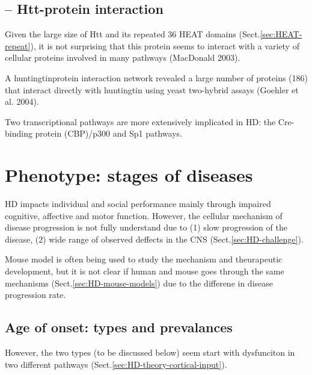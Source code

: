 \subsection{-- Htt-protein interaction}
\label{sec:HTT-protein-interaction}

Given the large size of Htt and its repeated 36 HEAT domains
(Sect.\ref{sec:HEAT-repeat}), it is not surprising that this protein seems to
interact with a variety of cellular proteins involved in many pathways
(MacDonald 2003).

A huntingtinprotein interaction network revealed a large number of proteins
(186) that interact directly with huntingtin using yeast two-hybrid assays
(Goehler et al. 2004).


Two transcriptional pathways are more extensively implicated in HD: the
Cre-binding protein (CBP)/p300 and Sp1 pathways. 


\section{Phenotype: stages of diseases}
\label{sec:HD-phenotype}

HD impacts individual and social performance mainly through impaired cognitive,
affective and motor function. However, the cellular mechanism of disease
progression is not fully understand due to (1) slow progression of the disease,
(2) wide range of observed deffects in the CNS (Sect.\ref{sec:HD-challenge}).

Mouse model is often being used to study the mechanism and theurapeutic
development, but it is not clear if human and mouse goes through the same
mechanisms (Sect.\ref{sec:HD-mouse-models}) due to the differene in disease
progression rate.

\subsection{Age of onset: types and prevalances}

However, the two types (to be discussed below) seem start with dysfunciton in
two different pathways (Sect.\ref{sec:HD-theory-cortical-input}).

